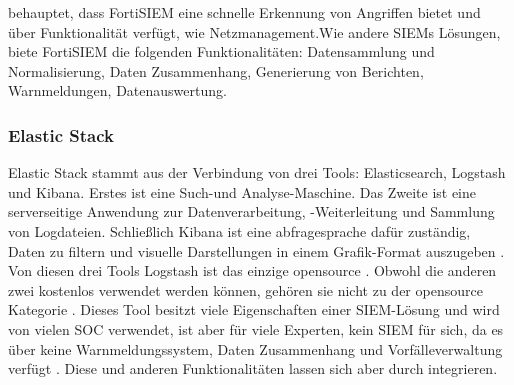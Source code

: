 
\citep{Ramires_fortsiem} behauptet, dass FortiSIEM eine schnelle Erkennung von Angriffen bietet und über  Funktionalität verfügt, wie Netzmanagement.Wie andere \glspl{SIEM} Lösungen, biete FortiSIEM die folgenden Funktionalitäten: Datensammlung und Normalisierung, Daten Zusammenhang, Generierung von Berichten, Warnmeldungen, Datenauswertung.


\subsubsection{Elastic Stack}
Elastic Stack stammt aus der Verbindung von drei Tools: Elasticsearch, Logstash und Kibana. Erstes ist eine Such-und Analyse-Maschine. Das Zweite ist eine serverseitige Anwendung zur Datenverarbeitung, -Weiterleitung und Sammlung von Logdateien. Schließlich Kibana \label{kibana} ist eine \gls{abfragesprache} dafür zuständig, Daten zu filtern und visuelle Darstellungen in einem Grafik-Format auszugeben \citep{packt_elkstack}. Von diesen drei Tools Logstash ist das einzige \gls{opensource} \citep{elastic_OSI}. Obwohl die anderen zwei
kostenlos verwendet werden können, gehören sie nicht zu der \gls{opensource} Kategorie \citep{OpenSource_Def}. Dieses Tool besitzt viele Eigenschaften einer \gls{SIEM}-Lösung und wird von vielen SOC verwendet, ist aber für viele Experten, kein \gls{SIEM} für sich, da es über keine Warnmeldungssystem, Daten Zusammenhang und Vorfälleverwaltung verfügt \citep{Miller_ELK}. Diese und anderen Funktionalitäten lassen sich aber durch  integrieren.

